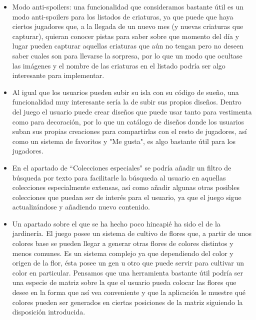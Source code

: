 \begin{itemize}
	
	\item Modo anti-spoilers: una funcionalidad que consideramos bastante útil es un modo anti-spoilers para los listados de criaturas, ya que puede que haya ciertos jugadores que, a la llegada de un nuevo mes (y nuevas criaturas que capturar), quieran conocer pistas para saber sobre que momento del día y lugar pueden capturar aquellas criaturas que aún no tengan pero no deseen saber cuales son para llevarse la sorpresa, por lo que un modo que ocultase las imágenes y el nombre de las criaturas en el listado podría ser algo interesante para implementar.
	
	\item Al igual que los usuarios pueden subir su isla con su código de sueño, una funcionalidad muy interesante sería la de subir sus propios diseños. Dentro del juego el usuario puede crear diseños que puede usar tanto para vestimenta como para decoración, por lo que un catálogo de diseños donde los usuarios suban sus propias creaciones para compartirlas con el resto de jugadores, así como un sistema de favoritos y "Me gusta", es algo bastante útil para los jugadores.
	
	\item En el apartado de ``Colecciones especiales" se podría añadir un filtro de búsqueda por texto para facilitarle la búsqueda al usuario en aquellas colecciones especialmente extensas, así como añadir algunas otras posibles colecciones que puedan ser de interés para el usuario, ya que el juego sigue actualizándose y añadiendo nuevo contenido.
	
	\item Un apartado sobre el que se ha hecho poco hincapié ha sido el de la jardinería. El juego posee un sistema de cultivo de flores que, a partir de unos colores base se pueden llegar a generar otras flores de colores distintos y menos comunes. Es un sistema complejo ya que dependiendo del color y origen de la flor, ésta posee un gen u otro que puede servir para cultivar un color en particular. Pensamos que una herramienta bastante útil podría ser una especie de matriz sobre la que el usuario pueda colocar las flores que desee en la forma que así vea conveniente y que la aplicación le muestre qué colores pueden ser generados en ciertas posiciones de la matriz siguiendo la disposición introducida.
	
\end{itemize}



	


